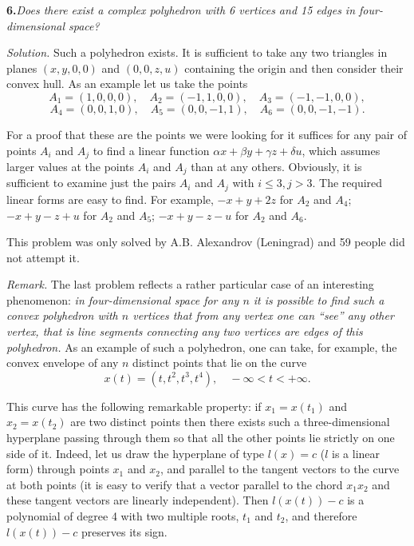 \documentclass[12pt]{amsart}
\begin{document}
\textbf{6.}\quad\textit{Does there exist a complex polyhedron with 6 vertices
and 15 edges in four-dimensional space?}

\textit{Solution.}
Such a polyhedron exists.
It is sufficient to take any two triangles in planes $(x,y,0,0)$ and
$(0,0,z,u)$ containing the origin and then consider their convex hull.
As an example let us take the points
$$A_1=(1,0,0,0),\quad A_2=(-1,1,0,0),\quad A_3=(-1,-1,0,0),$$
$$A_4=(0,0,1,0),\quad A_5=(0,0,-1,1),\quad A_6=(0,0,-1,-1).$$

For a proof that these are the points we were looking for it suffices for
any pair of points $A_i$ and $A_j$ to find a linear function
$\alpha x+\beta y+\gamma z+\delta u$, which assumes larger values at the
points $A_i$ and $A_j$ than at any others.
Obviously, it is sufficient to examine just the pairs $A_i$ and $A_j$ with
$i\leq3,j>3$.
The required linear forms are easy to find.
For example, $-x+y+2z$ for $A_2$ and $A_4$; $-x+y-z+u$ for $A_2$ and
$A_5$; $-x+y-z-u$ for $A_2$ and $A_6$.

This problem was only solved by A.B. Alexandrov (Leningrad) and 59 people did
not attempt it.

\textit{Remark.}
The last problem reflects a rather particular case of an interesting phenomenon:
\textit{in four-dimensional space for any $n$ it is possible to find such a
convex polyhedron with $n$ vertices that from any vertex one can
``see'' any other vertex, that is line segments connecting any two vertices
are edges of this polyhedron.}
As an example of such a polyhedron, one can take, for example, the convex
envelope of any $n$ distinct points that lie on the curve
\begin{equation}
x(t)=(t,t^2,t^3,t^4),\quad-\infty<t<+\infty.
\end{equation}

This curve has the following remarkable property: if $x_1=x(t_1)$ and
$x_2=x(t_2)$ are two distinct points then there exists such a three-dimensional
hyperplane passing through them so that all the other points lie strictly on
one side of it.
Indeed, let us draw the hyperplane of type $l(x)=c$ ($l$ is a linear form)
through points $x_1$ and $x_2$, and parallel to the tangent vectors to the curve
at both points (it is easy to verify that a vector parallel to the chord
$x_1x_2$ and these tangent vectors are linearly independent).
Then $l(x(t))-c$ is a polynomial of degree 4 with two multiple roots, $t_1$
and $t_2$, and therefore $l(x(t))-c$ preserves its sign.
\end{document}
